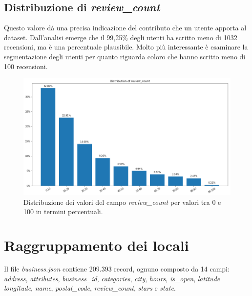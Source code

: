 \documentclass[12pt]{article}
\begin{document}
\subsection{Distribuzione di \textit{review\_count}}
Questo valore dà una precisa indicazione del contributo che un utente apporta al dataset. Dall'analisi emerge che il 99,25\% degli utenti ha scritto meno di 1032 recensioni, ma è una percentuale plausibile. Molto più interessante è esaminare la segmentazione degli utenti per quanto riguarda coloro che hanno scritto meno di 100 recensioni.
\begin{figure}[H]
\centering
\includegraphics[width=\textwidth]{images/review_count_distribution.png}
\caption{Distribuzione dei valori del campo \textit{review\_count} per valori tra 0 e 100 in termini percentuali.}
\end{figure}

\section{Raggruppamento dei locali}
\label{sec:businesses}
Il file \textit{business.json} contiene 209.393 record, ognuno composto da 14 campi: \textit{address}, \textit{attributes}, \textit{business\_id},	\textit{categories}, \textit{city}, \textit{hours}, \textit{is\_open},	\textit{latitude} \textit{longitude}, \textit{name}, \textit{postal\_code}, \textit{review\_count}, \textit{stars} e \textit{state}.
\end{document}
